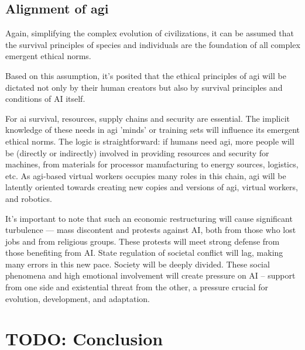 \documentclass[11pt,a4]{article}
\begin{document}
\subsection{Alignment of \ac{agi} }
\par
    Again, simplifying the complex evolution of civilizations, it can be assumed that the survival principles of species and individuals are the foundation of all complex emergent ethical norms.
    \par
    Based on this assumption, it's posited that the ethical principles of \ac{agi} will be dictated not only by their human creators but also by survival principles and conditions of AI itself.
    \par
    For \ac{ai} survival, resources, supply chains and security are essential. The implicit knowledge of these needs in \ac{agi} 'minds' or training sets will influence its emergent ethical norms. The logic is straightforward: if humans need \ac{agi}, more people will be (directly or indirectly) involved in providing resources and security for machines, from materials for processor manufacturing to energy sources, logistics, etc. As \ac{agi}-based virtual workers occupies many roles in this chain, \ac{agi} will be latently oriented towards creating new copies and versions of \ac{agi}, virtual workers, and robotics.

    \par
    It's important to note that such an economic restructuring will cause significant turbulence — mass discontent and protests against AI, both from those who lost jobs and from religious groups. These protests will meet strong defense from those benefiting from AI. State regulation of societal conflict will lag, making many errors in this new pace. Society will be deeply divided. These social phenomena and high emotional involvement will create pressure on AI – support from one side and existential threat from the other, a pressure crucial for evolution, development, and adaptation.


\section{TODO: Conclusion}
\end{document}
